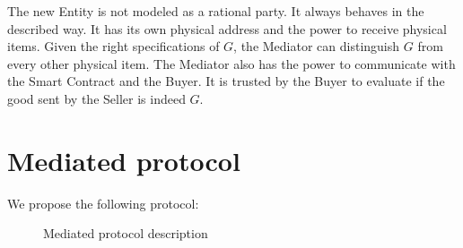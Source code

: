\documentclass{cacthesis}
\begin{document}
The new Entity is not modeled as a rational party. It always behaves in the described way. It has its own physical address and the power to receive physical items. Given the right specifications of $G$, the Mediator can distinguish $G$ from every other  physical item. The Mediator also has the power to communicate with the Smart Contract and the Buyer. It is trusted by the Buyer to evaluate if the good sent by the Seller is indeed $G$.
\section{Mediated protocol}
\label{sec:mediated-protocol}
We propose the following protocol:
\begin{figure}[htb!]
    \centering
    \caption{Mediated protocol description}
    \label{pro:mediated-protocol}
\end{figure}
\end{document}
